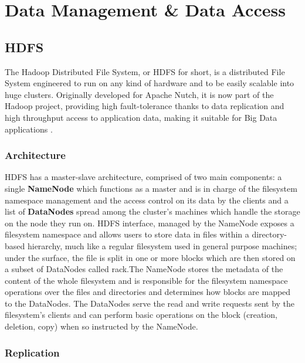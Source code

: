 \chapter{Data Management \& Data Access}

\section{HDFS}

The Hadoop Distributed File System, or HDFS for short, is a distributed File System engineered to run on any kind of hardware and to be easily scalable into huge clusters. Originally developed for Apache Nutch, it is now part of the Hadoop project, providing high fault-tolerance thanks to data replication and high throughput access to application data, making it suitable for Big Data applications \cite{hadoop_doc}.

\subsection{Architecture} 

HDFS has a master-slave architecture, comprised of two main components: a single \textbf{NameNode} which functions as a master and is in charge of the filesystem namespace management and the access control on its data by the clients and a list of \textbf{DataNodes} spread among the cluster's machines which handle the storage on the node they run on.\newline
HDFS interface, managed by the NameNode exposes a filesystem namespace and allows users to store data in files within a directory-based hierarchy, much like a regular filesystem used in general purpose machines; under the surface, the file is split in one or more blocks which are then stored on a subset of DataNodes called rack.\newline The NameNode stores the metadata of the content of the whole filesystem and is responsible for the filesystem namespace operations over the files and directories and determines how blocks are mapped to the DataNodes.
The DataNodes serve the read and write requests sent by the filesystem's clients and can perform basic operations on the block (creation, deletion, copy) when so instructed by the NameNode.

\subsection{Replication} 

